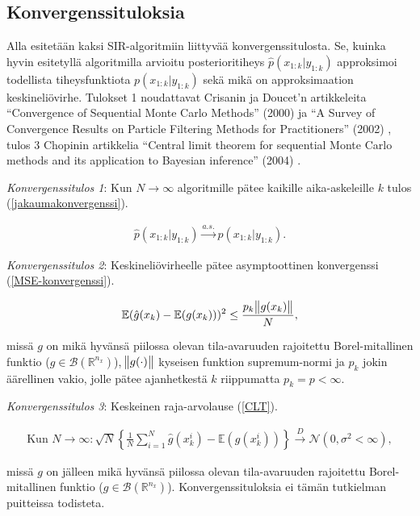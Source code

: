 \documentclass[
  12pt,
  a4paper, twoside]{book}
\begin{document}
\subsection{Konvergenssituloksia}

Alla esitetään kaksi SIR-algoritmiin liittyvää konvergenssitulosta. Se, kuinka hyvin esitetyllä algoritmilla arvioitu posterioritiheys \(\hat{p}(x_{1:k}|y_{1:k})\) approksimoi todellista tiheysfunktiota \(p(x_{1:k}|y_{1:k})\) sekä mikä on approksimaation keskineliövirhe. Tulokset 1 noudattavat Crisanin ja Doucet'n artikkeleita ``Convergence of Sequential Monte Carlo Methods'' (2000) \citep{crisan-2000} ja ``A Survey of Convergence Results on Particle Filtering Methods for Practitioners'' (2002) \citep{crisan-2002}, tulos 3 Chopinin artikkelia ``Central limit theorem for sequential Monte Carlo methods and its application to Bayesian inference'' (2004) \citep{chopin-2004}.

\textit{Konvergenssitulos 1}: Kun \(N \to \infty\) algoritmille pätee kaikille aika-askeleille \(k\) tulos (\ref{jakaumakonvergenssi}).

\begin{align}\label{jakaumakonvergenssi}
\hat{p}(x_{1:k}|y_{1:k}) \xrightarrow{a.s.} p(x_{1:k}|y_{1:k}).
\end{align}

\textit{Konvergenssitulos 2}: Keskineliövirheelle pätee asymptoottinen konvergenssi (\ref{MSE-konvergenssi}).

\begin{align}\label{MSE-konvergenssi}
\mathbb{E}(\hat{g}(x_k)-\mathbb{E}(g(x_k)))^2\leq\frac{p_k\norm{g(x_k)}}{N},
\end{align}

\noindent missä \(g\) on mikä hyvänsä piilossa olevan tila-avaruuden rajoitettu Borel-mitallinen funktio (\(g \in \mathcal{B}(\mathbb{R}^{n_x})\)), \(\norm{g(\cdot)}\) kyseisen funktion supremum-normi ja \(p_k\) jokin äärellinen vakio, jolle pätee ajanhetkestä \(k\) riippumatta \(p_k=p<\infty\).

\textit{Konvergenssitulos 3}: Keskeinen raja-arvolause (\ref{CLT}).

\begin{align}\label{CLT}
\text{Kun } N \to \infty: \sqrt{N} \left\{ \frac{1}{N} \sum_{i=1}^N \hat{g}(x_k^i) -\mathbb{E}(g(x_k^i)) \right\} \xrightarrow{D} \mathcal{N}(0,\sigma^2 < \infty),
\end{align}

\noindent missä \(g\) on jälleen mikä hyvänsä piilossa olevan tila-avaruuden rajoitettu Borel-mitallinen funktio (\(g \in \mathcal{B}(\mathbb{R}^{n_x})\)). Konvergenssituloksia ei tämän tutkielman puitteissa todisteta.
\end{document}
